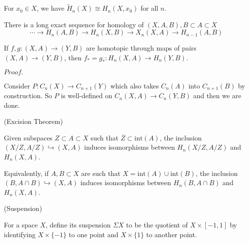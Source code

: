 \documentclass{article}
\newcommand{\Pf}[1]{$Proof.$\par}
\begin{document}
\begin{corollary}
    For $x_0\in X$, we have $\widetilde{H}_n(X) \cong H_n(X,x_0)$ for all $n$.
\end{corollary}

\begin{corollary}
    There is a long exact sequence for homology of $(X,A,B), B\subset A\subset X$
    \[
    \cdots \to H_n(A,B) \to H_n(X,B) \to X_n(X,A) \to H_{n-1}(A,B)
    \]
\end{corollary}

\begin{proposition}
    If $f,g:(X,A) \to (Y,B)$ are homotopic through maps of pairs $(X,A) \to (Y,B)$, then $f_* = g_*: H_n(X,A) \to H_n(Y,B)$.
\end{proposition}
\Pf\par
    Consider $P:C_n(X) \to C_{n+1}(Y)$ which also takes $C_n(A)$ into $C_{n+1}(B)$ by construction. So $P$ is well-defined on $C_n(X,A) \to C_n(Y,B)$ and then we are done.

\begin{theorem}(Excision Theorem)\par
    Given subspaces $Z\subset A \subset X$ such that $\overline{Z}\subset\text{int}(A)$, the inclusion $(X/Z, A/Z) \hookrightarrow (X,A)$ induces isomorphisms between $H_n(X/Z,A/Z)$ and $H_n(X,A)$.\par
    Equivalently, if $A,B\subset X$ are such that $X=\text{int}(A)\cup\text{int}(B)$, the inclusion $(B,A\cap B)\hookrightarrow (X,A)$ induces isomorphisms between $H_n(B,A\cap B)$ and $H_n(X,A)$.
\end{theorem}

\begin{definition}(Suspension)\par
    For a space $X$, define its suspension $\Sigma X$ to be the quotient of $X\times[-1,1]$ by identifying $X\times\{-1\}$ to one point and $X\times\{1\}$ to another point.
\end{definition}
\end{document}
